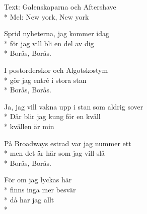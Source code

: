 \begin{SongText}
    \begin{SongInfo}
        Text: Galenskaparna och Aftershave\\*%
        Mel: New york, New york
    \end{SongInfo}
    \begin{SongVerse}
        Sprid nyheterna, jag kommer idag\\*%
        för jag vill bli en del av dig\\*%
        Borås, Borås.
    \end{SongVerse}
    \begin{SongVerse}
        I postorderskor och Algotskostym\\*%
        gör jag entré i stora stan\\*%
        Borås, Borås.
    \end{SongVerse}
    \begin{SongVerse}
        Ja, jag vill vakna upp i stan som aldrig sover\\*%
        Där blir jag kung för en kväll\\*%
        kvällen är min
    \end{SongVerse}
    \begin{SongVerse}
        På Broadways estrad var jag nummer ett\\*%
        men det är här som jag vill slå\\*%
        Borås, Borås.
    \end{SongVerse}
    \begin{SongVerse}
        För om jag lyckas här\\*%
        finns inga mer besvär\\*%
        då har jag allt\\*%

\end{SongVerse}
\end{SongText}
